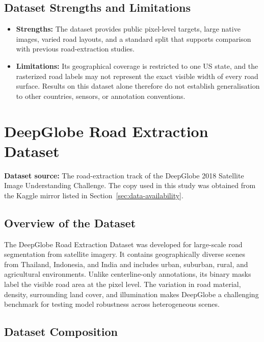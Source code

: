 \documentclass[11pt,a4paper]{article}
\begin{document}
\subsection{Dataset Strengths and Limitations}

\begin{itemize}
  \item \textbf{Strengths:} The dataset provides public pixel-level targets,
        large native images, varied road layouts, and a standard split that
        supports comparison with previous road-extraction studies.
  \item \textbf{Limitations:} Its geographical coverage is restricted to one US
        state, and the rasterized road labels may not represent the exact visible
        width of every road surface. Results on this dataset alone therefore do
        not establish generalisation to other countries, sensors, or annotation
        conventions.
\end{itemize}

\section{DeepGlobe Road Extraction Dataset}

\textbf{Dataset source:} The road-extraction track of the DeepGlobe 2018
Satellite Image Understanding Challenge. The copy used in this study was
obtained from the Kaggle mirror listed in Section~\ref{sec:data-availability}.

\subsection{Overview of the Dataset}

The DeepGlobe Road Extraction Dataset was developed for large-scale road
segmentation from satellite imagery. It contains geographically diverse scenes
from Thailand, Indonesia, and India and includes urban, suburban, rural, and
agricultural environments. Unlike centerline-only annotations, its binary masks
label the visible road area at the pixel level. The variation in road material,
density, surrounding land cover, and illumination makes DeepGlobe a challenging
benchmark for testing model robustness across heterogeneous scenes.

\subsection{Dataset Composition}
\end{document}
